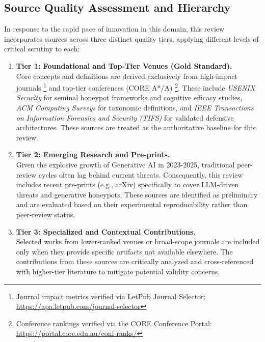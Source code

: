 \subsection{Source Quality Assessment and Hierarchy}
In response to the rapid pace of innovation in this domain, this review incorporates sources across three distinct quality tiers,
applying different levels of critical scrutiny to each:

\begin{enumerate}
      \item \textbf{Tier 1: Foundational and Top-Tier Venues (Gold Standard).} \\
            Core concepts and definitions are derived exclusively from high-impact journals
            \footnote{Journal impact metrics verified via LetPub Journal Selector: \url{https://apa.letpub.com/journal-selector}}
            and top-tier conferences (CORE A*/A)
            \footnote{Conference rankings verified via the CORE Conference Portal: \url{https://portal.core.edu.au/conf-ranks/}}.
            These include \textit{USENIX Security} for seminal honeypot frameworks and cognitive efficacy studies,
            \textit{ACM Computing Surveys} for taxonomic definitions, and \textit{IEEE Transactions on Information Forensics and Security
                  (TIFS)} for validated defensive architectures. These sources are treated as the authoritative baseline for this review.

      \item \textbf{Tier 2: Emerging Research and Pre-prints.} \\
            Given the explosive growth of Generative AI in 2023-2025, traditional peer-review cycles often lag behind current threats.
            Consequently, this review includes recent pre-prints (e.g., arXiv) specifically to cover LLM-driven threats
            and generative honeypots. These sources are identified as preliminary and are evaluated based on their experimental
            reproducibility rather than peer-review status.

      \item \textbf{Tier 3: Specialized and Contextual Contributions.} \\
            Selected works from lower-ranked venues or broad-scope journals are included only when they provide specific artifacts
            not available elsewhere. The contributions from these sources are critically analyzed
            and cross-referenced with higher-tier literature to mitigate potential validity concerns.
\end{enumerate}

